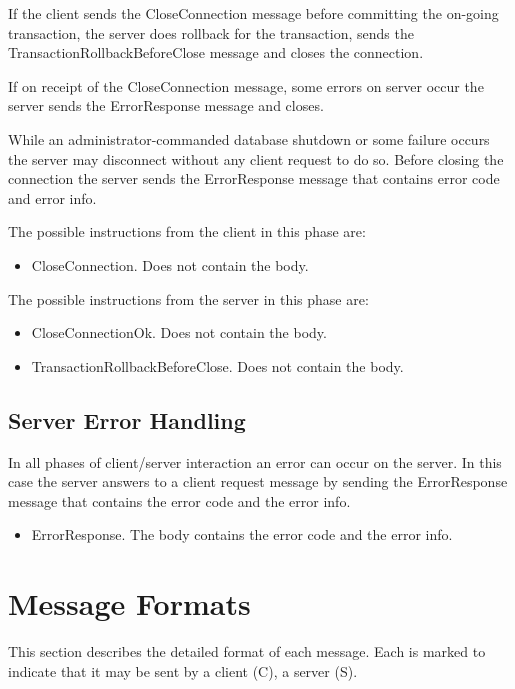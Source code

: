 \documentclass[a4paper,12pt]{article}
\begin{document}
If the client sends the CloseConnection message before committing the on-going transaction, the server does rollback for the transaction, sends the TransactionRollbackBeforeClose message and closes the connection.

If on receipt of the CloseConnection message, some errors on server occur the server sends the ErrorResponse message and closes.

While an administrator-commanded database shutdown or some failure occurs the server may disconnect without any client request to do so. Before closing the connection the server sends the ErrorResponse message that contains error code and error info. 

The possible instructions from the client in this phase are:
\begin{itemize}
\item CloseConnection. Does not contain the body. 
\end{itemize}

The possible instructions from the server in this phase are:
\begin{itemize}
\item CloseConnectionOk. Does not contain the body. 
\item TransactionRollbackBeforeClose. Does not contain the body.
\end{itemize}

\subsection{Server Error Handling}

In all phases of client/server interaction an error can occur on the server. In this case the server answers to a client request message by sending the ErrorResponse message that contains the error code and the error info.

\begin{itemize}
\item ErrorResponse. The body contains the error code and the error info. 
\end{itemize}



\section{Message Formats}

This section describes the detailed format of each message. Each is marked to indicate that it may be sent by a client (C), a server (S).
\end{document}
